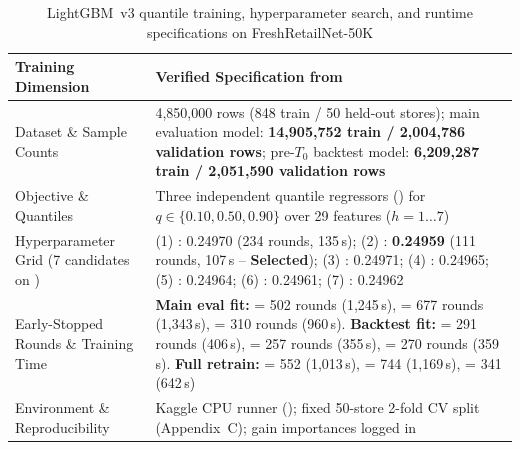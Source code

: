 \begin{table}[H]
\centering
\caption{LightGBM~v3 quantile training, hyperparameter search, and runtime specifications on FreshRetailNet-50K}
\label{tab:lgbm_training_setup}
\footnotesize
\begin{tabularx}{\textwidth}{L{3.7cm} Y}
\toprule
\textbf{Training Dimension} & \textbf{Verified Specification from } \\
\midrule
Dataset \& Sample Counts & 4,850,000 rows (848 train / 50 held-out stores); main evaluation model: \textbf{14,905,752 train / 2,004,786 validation rows}; pre-$T_0$ backtest model: \textbf{6,209,287 train / 2,051,590 validation rows} \\
Objective \& Quantiles & Three independent quantile regressors () for $q \in \{0.10, 0.50, 0.90\}$ over 29 features ($h=1\dots 7$) \\
Hyperparameter Grid (7 candidates on ) &
(1) : 0.24970 (234 rounds, 135\,s);
(2) \textbf{}: \textbf{0.24959} (111 rounds, 107\,s -- \textbf{Selected});
(3) : 0.24971;
(4) : 0.24965;
(5) : 0.24964;
(6) : 0.24961;
(7) : 0.24962 \\
Early-Stopped Rounds \& Training Time & \textbf{Main eval fit:}  = 502 rounds (1,245\,s),  = 677 rounds (1,343\,s),  = 310 rounds (960\,s). \textbf{Backtest fit:}  = 291 rounds (406\,s),  = 257 rounds (355\,s),  = 270 rounds (359\,s). \textbf{Full retrain:}  = 552 (1,013\,s),  = 744 (1,169\,s),  = 341 (642\,s) \\
Environment \& Reproducibility & Kaggle CPU runner (); fixed 50-store 2-fold CV split (Appendix~C); gain importances logged in  \\
\bottomrule
\end{tabularx}
\end{table}

